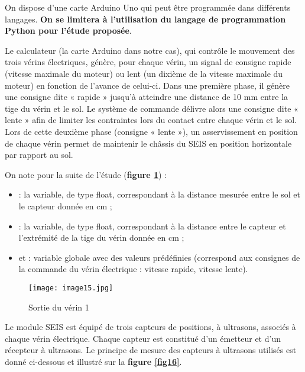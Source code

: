 On dispose d'une carte Arduino Uno qui peut être programmée dans
différents langages. \textbf{On se limitera à l'utilisation du
langage de programmation Python pour l'étude proposée}.

Le calculateur (la carte Arduino dans notre cas), qui contrôle le
mouvement des trois vérins électriques, génère, pour chaque vérin, un
signal de consigne rapide (vitesse maximale du moteur) ou lent (un
dixième de la vitesse maximale du moteur) en fonction de l'avance de
celui-ci. Dans une première phase, il génère une consigne dite « rapide
» jusqu'à atteindre une distance de 10 mm entre la tige du vérin et le
sol. Le système de commande délivre alors une consigne dite « lente »
afin de limiter les contraintes lors du contact entre chaque vérin et le
sol. Lors de cette deuxième phase (consigne « lente »), un
asservissement en position de chaque vérin permet de maintenir le
châssis du SEIS en position horizontale par rapport au sol.

On note pour la suite de l'étude (\textbf{figure \ref{fig15}}) :

\begin{itemize}
\item
   : la variable, de type float, correspondant à la
  distance mesurée entre le sol et le capteur donnée en cm ;
\item
   : la variable, de type float, correspondant à
  la distance entre le capteur et l'extrémité de la tige du vérin donnée
  en cm ;
\item
   et  : variable globale avec des valeurs
  prédéfinies (correspond aux consignes de la commande du vérin électrique : vitesse rapide, vitesse lente).
\end{itemize}


\begin{figure}[!htb]
\begin{center}
\texttt{[image: image15.jpg]}
\caption{Sortie du vérin 1 \label{fig15}}
\end{center}
\end{figure}



Le module SEIS est équipé de trois
capteurs de positions, à ultrasons, associés à chaque vérin électrique.
Chaque capteur est constitué d'un émetteur et d'un récepteur à
ultrasons. Le principe de mesure des capteurs à ultrasons utilisés est
donné ci-dessous et illustré sur la \textbf{figure \ref{fig16}}.

